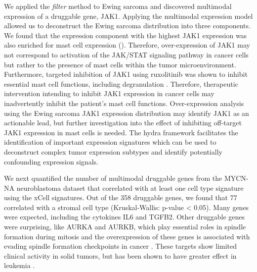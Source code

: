 \documentclass[10pt,letterpaper]{article}
\begin{document}
We applied the \textit{filter} method to Ewing sarcoma and discovered multimodal expression of a druggable gene, JAK1. Applying the multimodal expression model allowed us to deconstruct the Ewing sarcoma distribution into three components. We found that the expression component with the highest JAK1 expression was also enriched for mast cell expression (). Therefore, over-expression of JAK1 may not correspond to activation of the JAK/STAT signaling pathway in cancer cells but rather to the presence of mast cells within the tumor microenvironment. Furthermore, targeted inhibition of JAK1 using ruxolitinib was shown to inhibit essential mast cell functions, including degranulation \cite{hermansJAK1JAK2Inhibitor2018}. Therefore, therapeutic intervention intending to inhibit JAK1 expression in cancer cells may inadvertently inhibit the patient’s mast cell functions. Over-expression analysis using the Ewing sarcoma JAK1 expression distribution may identify JAK1 as an actionable lead, but further investigation into the effect of inhibiting off-target JAK1 expression in mast cells is needed. The hydra framework facilitates the identification of important expression signatures which can be used to deconstruct complex tumor expression subtypes and identify potentially confounding expression signals.

We next quantified the number of multimodal druggable genes from the MYCN-NA neuroblastoma dataset that correlated with at least one cell type signature using the xCell signatures. Out of the 358 druggable genes, we found that 77 correlated with a stromal cell type (Kruskal-Wallis: p-value < 0.05). Many genes were expected, including the cytokines IL6 and TGFB2. Other druggable genes were surprising, like AURKA and AURKB, which play essential roles in spindle formation during mitosis and the overexpression of these genes is associated with evading spindle formation checkpoints in cancer \cite{marisInitialTestingAurora2010}. These targets show limited clinical activity in solid tumors, but has been shown to have greater effect in leukemia \cite{marisInitialTestingAurora2010,gautschiAuroraKinasesAnticancer2008}.
\end{document}
